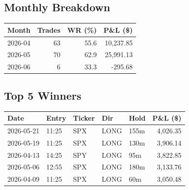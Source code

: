 \documentclass[11pt,a4paper,twoside]{article}
\begin{document}
\subsection{Monthly Breakdown}
\noindent\begin{center}
\begin{tabular}{>{\color{txtmain}}l rrr}
\toprule
\rowcolor{cardbg}
\textbf{Month} & \textbf{Trades} & \textbf{WR (\%)} & \textbf{P\&L (\$)} \\
\midrule
2026-04 & 63 & 55.6 & \textcolor{wingreen}{10,237.85} \\
2026-05 & 70 & 62.9 & \textcolor{wingreen}{25,991.13} \\
2026-06 & 6 & 33.3 & \textcolor{lossred}{-295.68} \\
\bottomrule
\end{tabular}
\end{center}
\subsection{Top 5 Winners}
\noindent\begin{center}
\begin{tabular}{>{\color{txtmain}}l llll r}
\toprule
\rowcolor{cardbg}
\textbf{Date} & \textbf{Entry} & \textbf{Ticker} & \textbf{Dir} & \textbf{Hold} & \textbf{P\&L (\$)} \\
\midrule
2026-05-21 & 11:25 & SPX & LONG & 155m & \textcolor{wingreen}{4,026.35} \\
2026-05-19 & 11:25 & SPX & LONG & 130m & \textcolor{wingreen}{3,906.14} \\
2026-04-13 & 14:25 & SPY & LONG & 95m & \textcolor{wingreen}{3,822.85} \\
2026-05-06 & 12:55 & SPX & LONG & 180m & \textcolor{wingreen}{3,133.76} \\
2026-04-09 & 11:25 & SPX & LONG & 60m & \textcolor{wingreen}{3,050.48} \\
\bottomrule
\end{tabular}
\end{center}
\end{document}
